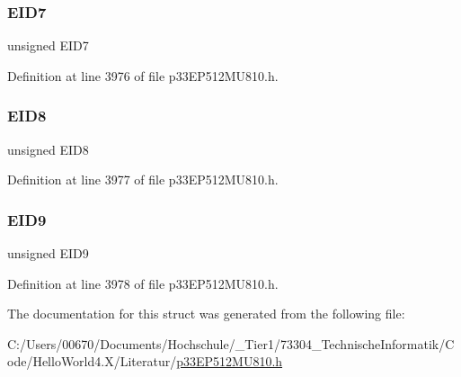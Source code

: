 \subsubsection{\texorpdfstring{E\+I\+D7}{EID7}}
{\footnotesize\ttfamily unsigned E\+I\+D7}



Definition at line 3976 of file p33\+E\+P512\+M\+U810.\+h.

\mbox{\label{structtag_c1_r_x_f4_e_i_d_b_i_t_s_acca25e0b7d86eb499d01f85222baea87}} 
\subsubsection{\texorpdfstring{E\+I\+D8}{EID8}}
{\footnotesize\ttfamily unsigned E\+I\+D8}



Definition at line 3977 of file p33\+E\+P512\+M\+U810.\+h.

\mbox{\label{structtag_c1_r_x_f4_e_i_d_b_i_t_s_ac6748f73d4ada8538b06548be4f396c2}} 
\subsubsection{\texorpdfstring{E\+I\+D9}{EID9}}
{\footnotesize\ttfamily unsigned E\+I\+D9}



Definition at line 3978 of file p33\+E\+P512\+M\+U810.\+h.



The documentation for this struct was generated from the following file\+:\begin{DoxyCompactItemize}
\item 
C\+:/\+Users/00670/\+Documents/\+Hochschule/\+\_\+\+Tier1/73304\+\_\+\+Technische\+Informatik/\+Code/\+Hello\+World4.\+X/\+Literatur/\hyperlink{p33_e_p512_m_u810_8h}{p33\+E\+P512\+M\+U810.\+h}\end{DoxyCompactItemize}
